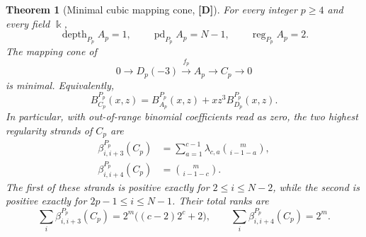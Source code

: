 \documentclass[11pt]{article}
\newtheorem{theorem}{Theorem}[section]
\theoremstyle{definition}
\theoremstyle{remark}
\newcommand{\kfield}{\Bbbk}
\begin{document}
\begin{theorem}[Minimal cubic mapping cone, {\bf[D]}]
\label{thm:minimal-cubic-cone}
For every integer \(p\ge4\) and every field \(\kfield\),
\begin{equation}
\operatorname{depth}_{P_p}A_p=1,\qquad
\operatorname{pd}_{P_p}A_p=N-1,\qquad
\operatorname{reg}_{P_p}A_p=2.
\label{eq:quadratic-quotient-invariants}
\end{equation}
The mapping cone of
\[
0\longrightarrow D_p(-3)\xrightarrow{\,f_p\,}A_p
 \longrightarrow C_p\longrightarrow0
\]
is minimal. Equivalently,
\begin{equation}
B_{C_p}^{P_p}(x,z)=B_{A_p}^{P_p}(x,z)+xz^3B_{D_p}^{P_p}(x,z).
\label{eq:minimal-cubic-cone}
\end{equation}
In particular, with out-of-range binomial coefficients read as zero, the two highest regularity
strands of \(C_p\) are
\begin{align}
\beta_{i,i+3}^{P_p}(C_p)
 &=\sum_{a=1}^{c-1}\lambda_{c,a}\binom m{i-1-a},
 \label{eq:special-fiber-row-three}\\
\beta_{i,i+4}^{P_p}(C_p)
 &=\binom m{i-1-c}.
 \label{eq:special-fiber-row-four}
\end{align}
The first of these strands is positive exactly for \(2\le i\le N-2\), while the second is
positive exactly for \(2p-1\le i\le N-1\). Their total ranks are
\begin{equation}
\sum_i\beta_{i,i+3}^{P_p}(C_p)=2^m\bigl((c-2)2^c+2\bigr),
\qquad
\sum_i\beta_{i,i+4}^{P_p}(C_p)=2^m.
\label{eq:special-fiber-upper-totals}
\end{equation}
\end{theorem}
\end{document}
